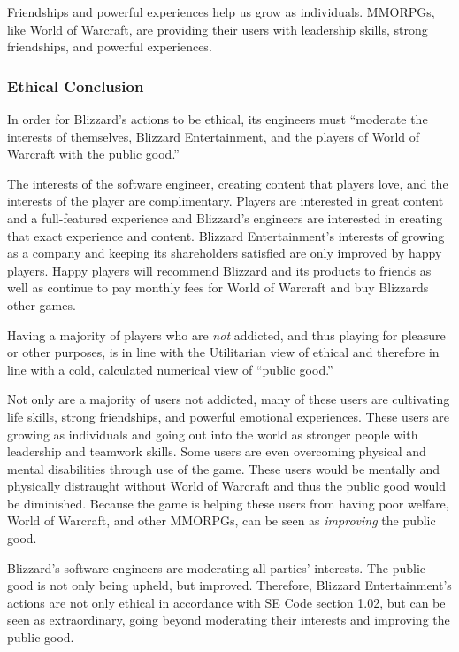 \documentclass[11pt]{article}
\begin{document}
\begin{multicols}{2}
Friendships and powerful experiences help us grow as individuals. MMORPGs, like World of Warcraft, are providing their users with leadership skills, strong friendships, and powerful experiences.

\subsubsection{Ethical Conclusion}
In order for Blizzard's actions to be ethical, its engineers must ``moderate the interests of themselves, Blizzard Entertainment, and the players of World of Warcraft with the public good.''

The interests of the software engineer, creating content that players love, and the interests of the player are complimentary. Players are interested in great content and a full-featured experience and Blizzard's engineers are interested in creating that exact experience and content.
Blizzard Entertainment's interests of growing as a company and keeping its shareholders satisfied are only improved by happy players. Happy players will recommend Blizzard and its products to friends as well as continue to pay monthly fees for World of Warcraft and buy Blizzards other games.

Having a majority of players who are \emph{not} addicted, and thus playing for pleasure or other purposes, is in line with the Utilitarian view of ethical and therefore in line with a cold, calculated numerical view of ``public good.''

Not only are a majority of users not addicted, many of these users are cultivating life skills, strong friendships, and powerful emotional experiences. These users are growing as individuals and going out into the world as stronger people with leadership and teamwork skills.
Some users are even overcoming physical and mental disabilities through use of the game. These users would be mentally and physically distraught without World of Warcraft and thus the public good would be diminished. Because the game is helping these users from having poor welfare, World of Warcraft, and other MMORPGs, can be seen as \emph{improving} the public good.

Blizzard's software engineers are moderating all parties' interests. The public good is not only being upheld, but improved. Therefore, Blizzard Entertainment's actions are not only ethical in accordance with SE Code section 1.02, but can be seen as extraordinary, going beyond moderating their interests and improving the public good.

\end{multicols}
\newpage




\end{document}
